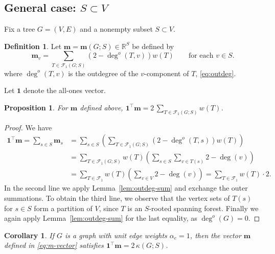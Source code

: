 \documentclass{amsart}
\newtheorem{prop}[thm]{Proposition}
\newtheorem{cor}[thm]{Corollary}
\theoremstyle{definition}
\newtheorem{dfn}[thm]{Definition}
\newcommand{\RR}{\mathbb{R}}
\newcommand{\bone}{\mathbf{1}}
\newcommand{\boldm}{\mathbf{m}}
\newcommand{\tr}{\intercal}
\newcommand{\trees}{\mathcal{F}_1}
\newcommand{\degout}{\deg^o}
\begin{document}
\subsection{General case: $S \subset V$}
Fix a tree $G = (V,E)$ and a nonempty subset $S \subset V$.
\begin{dfn}
\label{dfn:m-vector}
Let $\boldm = \boldm(G;S) \in \RR^S$ be defined by
\begin{equation}
\label{eq:m-vector}
\boldm_v =  \sum_{T \in \trees(G;S)} (2 - \degout(T,v)) w(T)
\qquad\text{for each }v \in S.
\end{equation}
where $\degout(T,v)$ is the outdegree of the $v$-component of $T$, \eqref{eq:outdeg}.
\end{dfn}

Let $\bone$ denote the all-ones vector.
\begin{prop}
For $\boldm$ defined above, $\displaystyle \bone^\tr \boldm = 2 \,\sum_{T \in \trees(G;S)} w(T)$.
\end{prop}
\begin{proof}
We have
\begin{align}
	\bone^\tr \boldm = \sum_{s\in S} \boldm_s &= \sum_{s \in S} \left( \sum_{T \in \trees(G;S)} (2 - \degout (T,s)) w(T) \right) \\
	&= \sum_{T \in \trees(G;S)} w(T) \left( \sum_{s\in S} \sum_{v \in T(s)} 2 - \deg(v) \right) \\
	&= \sum_{T \in \trees} w(T) \left( \sum_{v \in V} 2 - \deg(v)\right)
	= \sum_{T \in \trees} w(T) \cdot 2 .
\end{align}
In the second line we apply Lemma~\ref{lem:outdeg-sum} and exchange the outer summations.
To obtain the third line, we observe that the vertex sets of $T(s)$ for $s \in S$ form a partition of $V$, since $T$ is an $S$-rooted spanning forest. 
Finally we again apply Lemma~\ref{lem:outdeg-sum} for the last equality, as $\degout(G) = 0$.
\end{proof}

\begin{cor}
If $G$ is a graph with unit edge weights $\alpha_e = 1$, then the vector $\boldm$ defined in \eqref{eq:m-vector} satisfies $\bone^\tr \boldm = 2\, \kappa(G;S)$.
\end{cor}
\end{document}

